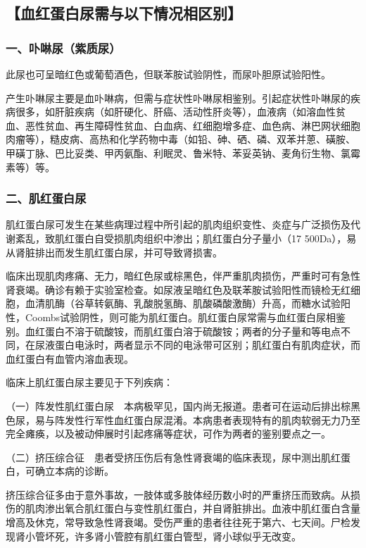 \subsection{【血红蛋白尿需与以下情况相区别】}

\subsubsection{一、卟啉尿（紫质尿）}

此尿也可呈暗红色或葡萄酒色，但联苯胺试验阴性，而尿卟胆原试验阳性。

产生卟啉尿主要是血卟啉病，但需与症状性卟啉尿相鉴别。引起症状性卟啉尿的疾病很多，如肝脏疾病（如肝硬化、肝癌、活动性肝炎等），血液病（如溶血性贫血、恶性贫血、再生障碍性贫血、白血病、红细胞增多症、血色病、淋巴网状细胞肉瘤等），糙皮病、高热和化学药物中毒（如铅、砷、硒、磷、双苯并蒽、磺胺、甲磺丁脉、巴比妥类、甲丙氨酯、利眠灵、鲁米特、苯妥英钠、麦角衍生物、氯霉素等）等。

\subsubsection{二、肌红蛋白尿}

肌红蛋白尿可发生在某些病理过程中所引起的肌肉组织变性、炎症与广泛损伤及代谢紊乱，致肌红蛋白自受损肌肉组织中渗出；肌红蛋白分子量小（17
500Da），易从肾脏排出而发生肌红蛋白尿，并可导致肾损害。

临床出现肌肉疼痛、无力，暗红色尿或棕黑色，伴严重肌肉损伤，严重时可有急性肾衰竭。确诊有赖于实验室检查。如尿液呈暗红色及联苯胺试验阳性而镜检无红细胞，血清肌酶（谷草转氨酶、乳酸脱氢酶、肌酸磷酸激酶）升高，而糖水试验阳性，Coombs试验阴性，则可能为肌红蛋白。肌红蛋白尿常需与血红蛋白尿相鉴别。血红蛋白不溶于硫酸铵，而肌红蛋白溶于硫酸铵；两者的分子量和等电点不同，在尿液蛋白电泳时，两者显示不同的电泳带可区别；肌红蛋白有肌肉症状，而血红蛋白有血管内溶血表现。

临床上肌红蛋白尿主要见于下列疾病：

（一）阵发性肌红蛋白尿　本病极罕见，国内尚无报道。患者可在运动后排出棕黑色尿，易与阵发性行军性血红蛋白尿混淆。本病患者表现特有的肌肉软弱无力乃至完全瘫痪，以及被动伸展时引起疼痛等症状，可作为两者的鉴别要点之一。

（二）挤压综合征　患者受挤压伤后有急性肾衰竭的临床表现，尿中测出肌红蛋白，可确立本病的诊断。

挤压综合征多由于意外事故，一肢体或多肢体经历数小时的严重挤压而致病。从损伤的肌肉渗出氧合肌红蛋白与变性肌红蛋白，并自肾脏排出。血液中肌红蛋白含量增高及休克，常导致急性肾衰竭。受伤严重的患者往往死于第六、七天间。尸检发现肾小管坏死，许多肾小管腔有肌红蛋白管型，肾小球似乎无改变。

